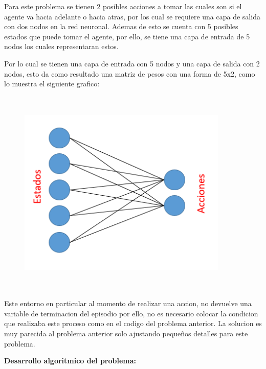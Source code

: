 Para este problema se tienen 2 posibles acciones a tomar las cuales son si el agente va hacia adelante o hacia atras, por los cual se requiere una capa de salida con dos nodos en la red neuronal. Ademas de esto se cuenta con 5 posibles estados que puede tomar el agente, por ello, se tiene una capa de entrada de 5 nodos los cuales representaran estos.

Por lo cual se tienen una capa de entrada con 5 nodos y una capa de salida con 2 nodos, esto da como resultado una matriz de pesos con una forma de 5x2, como lo muestra el siguiente grafico:

\begin{figure}[ht]
	\centering
	\includegraphics*[width=10cm,height=10cm,keepaspectratio]{figuras/red2} 
	\label{fig:red2}
\end{figure}

Este entorno en particular al momento de realizar una accion, no devuelve una variable de terminacion del episodio por ello, no es necesario colocar la condicion que realizaba este proceso como en el codigo del problema anterior. La solucion es muy parecida al problema anterior solo ajustando pequeños detalles para este problema.

\textbf{Desarrollo algoritmico del problema:}


